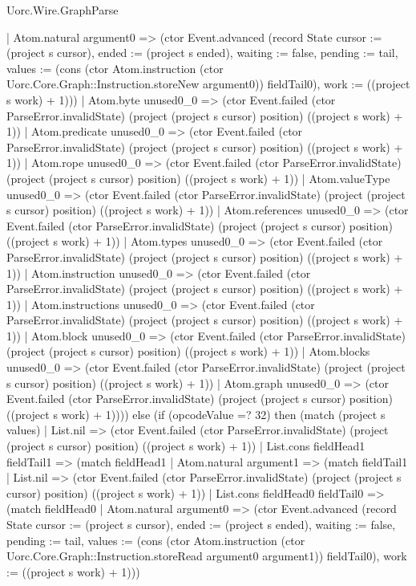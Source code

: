 \begin{lexlean}{Uorc.Wire.GraphParse}
\begin{semanticmodule}
{          | Atom.natural argument0 => (ctor Event.advanced (record State {cursor := (project s cursor), ended := (project s ended), waiting := false, pending := tail, values := (cons (ctor Atom.instruction (ctor Uorc.Core.Graph::Instruction.storeNew argument0)) fieldTail0), work := ((project s work) + 1)}))
          | Atom.byte unused0_0 => (ctor Event.failed (ctor ParseError.invalidState) (project (project s cursor) position) ((project s work) + 1))
          | Atom.predicate unused0_0 => (ctor Event.failed (ctor ParseError.invalidState) (project (project s cursor) position) ((project s work) + 1))
          | Atom.rope unused0_0 => (ctor Event.failed (ctor ParseError.invalidState) (project (project s cursor) position) ((project s work) + 1))
          | Atom.valueType unused0_0 => (ctor Event.failed (ctor ParseError.invalidState) (project (project s cursor) position) ((project s work) + 1))
          | Atom.references unused0_0 => (ctor Event.failed (ctor ParseError.invalidState) (project (project s cursor) position) ((project s work) + 1))
          | Atom.types unused0_0 => (ctor Event.failed (ctor ParseError.invalidState) (project (project s cursor) position) ((project s work) + 1))
          | Atom.instruction unused0_0 => (ctor Event.failed (ctor ParseError.invalidState) (project (project s cursor) position) ((project s work) + 1))
          | Atom.instructions unused0_0 => (ctor Event.failed (ctor ParseError.invalidState) (project (project s cursor) position) ((project s work) + 1))
          | Atom.block unused0_0 => (ctor Event.failed (ctor ParseError.invalidState) (project (project s cursor) position) ((project s work) + 1))
          | Atom.blocks unused0_0 => (ctor Event.failed (ctor ParseError.invalidState) (project (project s cursor) position) ((project s work) + 1))
          | Atom.graph unused0_0 => (ctor Event.failed (ctor ParseError.invalidState) (project (project s cursor) position) ((project s work) + 1)))) else (if (opcodeValue =? 32) then (match (project s values)
        | List.nil => (ctor Event.failed (ctor ParseError.invalidState) (project (project s cursor) position) ((project s work) + 1))
        | List.cons fieldHead1 fieldTail1 => (match fieldHead1
          | Atom.natural argument1 => (match fieldTail1
            | List.nil => (ctor Event.failed (ctor ParseError.invalidState) (project (project s cursor) position) ((project s work) + 1))
            | List.cons fieldHead0 fieldTail0 => (match fieldHead0
              | Atom.natural argument0 => (ctor Event.advanced (record State {cursor := (project s cursor), ended := (project s ended), waiting := false, pending := tail, values := (cons (ctor Atom.instruction (ctor Uorc.Core.Graph::Instruction.storeRead argument0 argument1)) fieldTail0), work := ((project s work) + 1)}))
}
\end{semanticmodule}
\end{lexlean}
